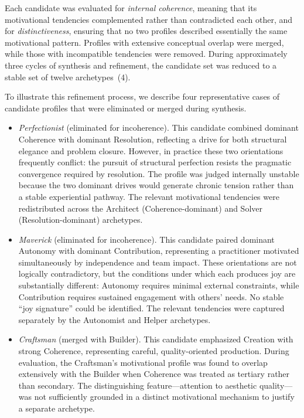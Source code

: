 \documentclass[12pt]{elsarticle}
\begin{document}
Each candidate was evaluated for \emph{internal coherence}, meaning that its 
motivational tendencies complemented rather than contradicted each other, and 
for \emph{distinctiveness}, ensuring that no two profiles described essentially 
the same motivational pattern. Profiles with extensive conceptual overlap were 
merged, while those with incompatible tendencies were removed. During 
approximately three cycles of synthesis and refinement, the candidate set was 
reduced to a stable set of twelve archetypes~(4).

To illustrate this refinement process, we describe four representative cases of candidate profiles that were eliminated or merged during synthesis.

\begin{itemize}
\item \textit{Perfectionist} (eliminated for incoherence). This candidate combined dominant Coherence with dominant Resolution, reflecting a drive for both structural elegance and problem closure. However, in practice these two orientations frequently conflict: the pursuit of structural perfection resists the pragmatic convergence required by resolution. The profile was judged internally unstable because the two dominant drives would generate chronic tension rather than a stable experiential pathway. The relevant motivational tendencies were redistributed across the Architect (Coherence-dominant) and Solver (Resolution-dominant) archetypes.

\item \textit{Maverick} (eliminated for incoherence). This candidate paired dominant Autonomy with dominant Contribution, representing a practitioner motivated simultaneously by independence and team impact. These orientations are not logically contradictory, but the conditions under which each produces joy are substantially different: Autonomy requires minimal external constraints, while Contribution requires sustained engagement with others' needs. No stable ``joy signature'' could be identified. The relevant tendencies were captured separately by the Autonomist and Helper archetypes.

\item \textit{Craftsman} (merged with Builder). This candidate emphasized Creation with strong Coherence, representing careful, quality-oriented production. During evaluation, the Craftsman's motivational profile was found to overlap extensively with the Builder when Coherence was treated as tertiary rather than secondary. The distinguishing feature---attention to aesthetic quality---was not sufficiently grounded in a distinct motivational mechanism to justify a separate archetype.


\end{itemize}
\end{document}
